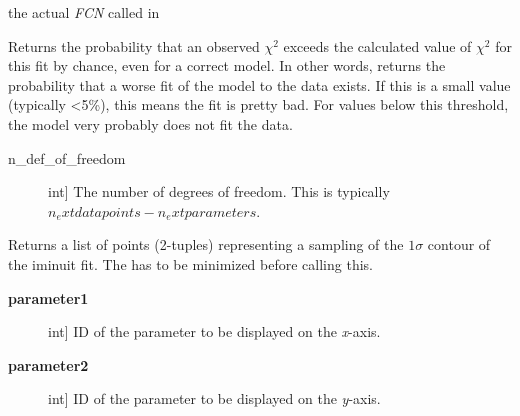\documentclass[a4paper,10pt,english]{sphinxmanual}
\begin{document}
\begin{fulllineitems}
\begin{fulllineitems}
\end{fulllineitems}


\begin{fulllineitems}
\label{index:kafe.iminuit_wrapper.IMinuit.function_to_minimize}
the actual \emph{FCN} called in 

\end{fulllineitems}


\begin{fulllineitems}
\label{index:kafe.iminuit_wrapper.IMinuit.get_chi2_probability}
Returns the probability that an observed \(\chi^2\) exceeds
the calculated value of \(\chi^2\) for this fit by chance,
even for a correct model. In other words, returns the probability that
a worse fit of the model to the data exists. If this is a small value
(typically \textless{}5\%), this means the fit is pretty bad. For values below
this threshold, the model very probably does not fit the data.
\begin{description}
\item[{n\_def\_of\_freedom}] \leavevmode{[}int{]}
The number of degrees of freedom. This is typically
\(n_   ext{datapoints} - n_    ext{parameters}\).

\end{description}

\end{fulllineitems}


\begin{fulllineitems}
\label{index:kafe.iminuit_wrapper.IMinuit.get_contour}
Returns a list of points (2-tuples) representing a sampling of
the \(1\sigma\) contour of the iminuit fit. The  has
to be minimized before calling this.
\begin{description}
\item[{\textbf{parameter1}}] \leavevmode{[}int{]}
ID of the parameter to be displayed on the \emph{x}-axis.

\item[{\textbf{parameter2}}] \leavevmode{[}int{]}
ID of the parameter to be displayed on the \emph{y}-axis.


\end{description}
\end{fulllineitems}
\end{fulllineitems}
\end{document}
